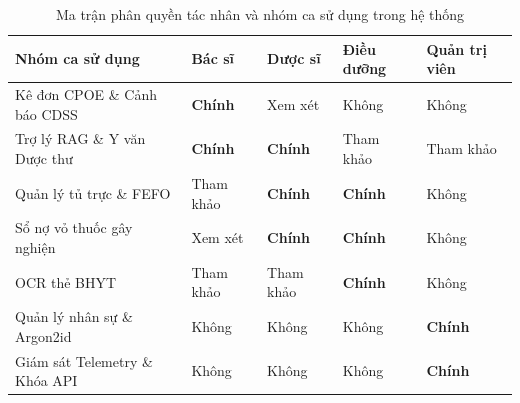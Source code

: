 \begin{table}[htbp]
\centering
\small
\renewcommand{\arraystretch}{1.15}
\begin{tabularx}{\textwidth}{L{4.5cm} C{2.2cm} C{2.2cm} C{2.2cm} C{2.2cm}}
\toprule
\textbf{Nhóm ca sử dụng} & \textbf{Bác sĩ} & \textbf{Dược sĩ} & \textbf{Điều dưỡng} & \textbf{Quản trị viên} \\
\midrule
Kê đơn CPOE \& Cảnh báo CDSS & \textbf{Chính} & Xem xét & Không & Không \\
\addlinespace
Trợ lý RAG \& Y văn Dược thư & \textbf{Chính} & \textbf{Chính} & Tham khảo & Tham khảo \\
\addlinespace
Quản lý tủ trực \& FEFO & Tham khảo & \textbf{Chính} & \textbf{Chính} & Không \\
\addlinespace
Sổ nợ vỏ thuốc gây nghiện & Xem xét & \textbf{Chính} & \textbf{Chính} & Không \\
\addlinespace
OCR thẻ BHYT & Tham khảo & Tham khảo & \textbf{Chính} & Không \\
\addlinespace
Quản lý nhân sự \& Argon2id & Không & Không & Không & \textbf{Chính} \\
\addlinespace
Giám sát Telemetry \& Khóa API & Không & Không & Không & \textbf{Chính} \\
\bottomrule
\end{tabularx}
\caption{Ma trận phân quyền tác nhân và nhóm ca sử dụng trong hệ thống}
\label{tab:actor_use_case_matrix}
\end{table}
